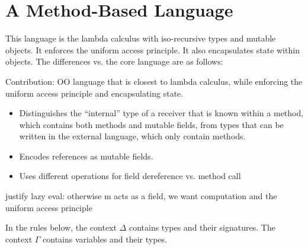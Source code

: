 \section{A Method-Based Language}

This language is the lambda calculus with iso-recursive types and mutable objects.  It enforces the uniform access principle.  It also encapsulates state within objects.  The differences vs. the core language are as follows:

Contribution: OO language that is closest to lambda calculus, while enforcing the uniform access principle and encapsulating state.

\begin{itemize}

 \item Distinguishes the ``internal'' type of a receiver that is known within a method, which contains both methods and mutable fields, from types that can be written in the external language, which only contain methods.
 
 \item Encodes references as mutable fields.
 
 \item Uses different operations for field dereference vs. method call

\end{itemize}

justify lazy eval: otherwise m acts as a field, we want computation and the uniform access principle

In the rules below, the context $\Delta$ contains types and their signatures. The context $\Gamma$ contains variables and their types. 



